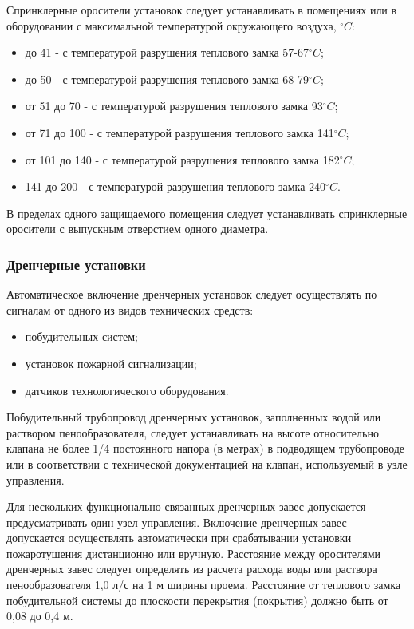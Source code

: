 Спринклерные оросители установок следует устанавливать в помещениях или в оборудовании с максимальной температурой окружающего воздуха,
${^\circ{C}}$:
\begin{itemize}
\item до 41 - с температурой разрушения теплового замка 57-67${^\circ{C}}$;
\item до 50 - с температурой разрушения теплового замка 68-79${^\circ{C}}$;
\item от 51 до 70 - с температурой разрушения теплового замка 93${^\circ{C}}$;
\item от 71 до 100 - с температурой разрушения теплового замка 141${^\circ{C}}$;
\item от 101 до 140 - с температурой разрушения теплового замка 182${^\circ{C}}$;
\item 141 до 200 - с температурой разрушения теплового замка 240${^\circ{C}}$.
\end{itemize}
 
В пределах одного защищаемого помещения следует устанавливать спринклерные оросители с выпускным отверстием одного диаметра.
 
\subsubsection*{Дренчерные установки}
Автоматическое включение дренчерных установок следует осуществлять по сигналам от одного из видов технических средств:
\begin{itemize}
\item побудительных систем;
\item установок пожарной сигнализации;
\item датчиков технологического оборудования.
\end{itemize}
 
Побудительный трубопровод дренчерных установок, заполненных водой или раствором пенообразователя, следует устанавливать на
высоте относительно клапана не более 1/4 постоянного напора (в метрах) в подводящем трубопроводе или в соответствии с
технической документацией на клапан, используемый в узле управления.

Для нескольких функционально связанных дренчерных завес допускается предусматривать один узел управления.
Включение дренчерных завес допускается осуществлять автоматически при срабатывании установки пожаротушения
дистанционно или вручную. Расстояние между оросителями дренчерных завес следует определять из расчета расхода
воды или раствора пенообразователя 1,0 л/с на 1 м ширины проема. Расстояние от теплового замка побудительной системы
до плоскости перекрытия (покрытия) должно быть от 0,08 до 0,4 м.

